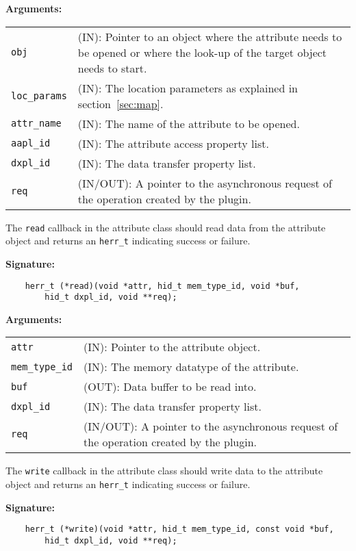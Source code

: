 \textbf{Arguments:}\\
\begin{tabular}{l p{10cm}}
  {\tt obj} & (IN): Pointer to an object where the attribute needs to be
  opened or where the look-up of the target object needs to start.\\
  {\tt loc\_params} & (IN): The location parameters as explained in
  section~\ref{sec:map}.\\
  {\tt attr\_name} & (IN): The name of the attribute to be opened.\\
  {\tt aapl\_id} & (IN): The attribute access property list.\\
  {\tt dxpl\_id} & (IN): The data transfer property list.\\
  {\tt req} & (IN/OUT): A pointer to the asynchronous request of the
  operation created by the plugin.\\
\end{tabular}

The {\tt read} callback in the attribute class should read data from
the attribute object and returns an {\tt herr\_t} indicating success or
failure.

\textbf{Signature:}
\begin{lstlisting}
    herr_t (*read)(void *attr, hid_t mem_type_id, void *buf, 
        hid_t dxpl_id, void **req);
\end{lstlisting}

\textbf{Arguments:}\\
\begin{tabular}{l p{10cm}}
  {\tt attr} & (IN): Pointer to the attribute object.\\
  {\tt mem\_type\_id} & (IN): The memory datatype of the attribute.\\
  {\tt buf} & (OUT): Data buffer to be read into.\\
  {\tt dxpl\_id} & (IN): The data transfer property list.\\
  {\tt req} & (IN/OUT): A pointer to the asynchronous request of the
  operation created by the plugin.\\
\end{tabular}

The {\tt write} callback in the attribute class should write data to
the attribute object and returns an {\tt herr\_t} indicating success or
failure.

\textbf{Signature:}
\begin{lstlisting}
    herr_t (*write)(void *attr, hid_t mem_type_id, const void *buf, 
        hid_t dxpl_id, void **req);
\end{lstlisting}

